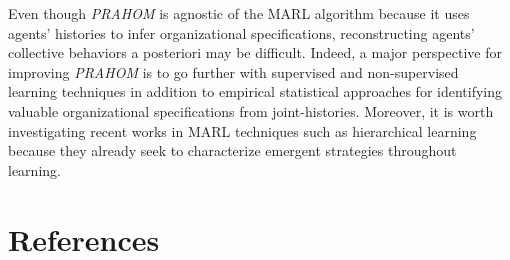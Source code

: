 \documentclass[runningheads]{llncs}
\begin{document}
Even though \emph{PRAHOM} is agnostic of the MARL algorithm because it uses agents' histories to infer organizational specifications, reconstructing agents' collective behaviors a posteriori may be difficult. Indeed, a major perspective for improving \emph{PRAHOM} is to go further with supervised and non-supervised learning techniques in addition to empirical statistical approaches for identifying valuable organizational specifications from joint-histories. Moreover, it is worth investigating recent works in MARL techniques such as hierarchical learning because they already seek to characterize emergent strategies throughout learning.


%
%
% 
% 
%
\section*{References}

% 



\end{document}
